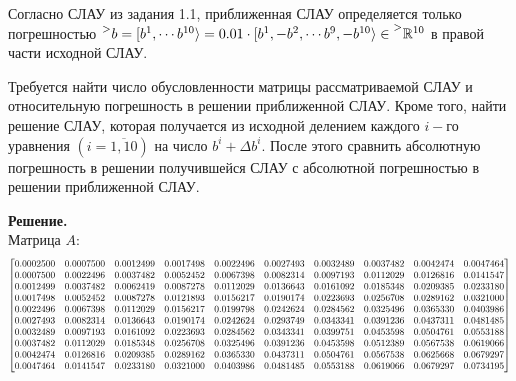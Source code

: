\documentclass[14pt,a4paper]{scrartcl}
\newcommand\scalemath[2]{\scalebox{#1}{\mbox{\ensuremath{\displaystyle #2}}}}
\begin{document}
Согласно СЛАУ из задания 1.1, приближенная СЛАУ определяется только погрешностью $\prescript{>}{}{b} = [b^1, \cdots b^{10}\rangle = 0.01 \cdot [b^1, -b^2, \cdots b^9, -b^{10}\rangle \in \prescript{>}{}{\mathbb{R}^{10}}$ в правой части исходной СЛАУ.

Требуется найти число обусловленности матрицы рассматриваемой СЛАУ и относительную погрешность в решении приближенной СЛАУ. Кроме того, найти решение СЛАУ, которая получается из исходной делением каждого $i-$го уравнения $(i = \overline{1,10})$ на число $b^i + \Delta b^i$. После этого сравнить абсолютную погрешность в решении получившейся СЛАУ с абсолютной погрешностью в решении приближенной СЛАУ.

\textbf{Решение.}\\
Матрица $A$:
\begin{equation*}
	\scalemath{0.75}
	{
		\begin{bmatrix}{}
		0.0002500 & 0.0007500 & 0.0012499 & 0.0017498 & 0.0022496 & 0.0027493 & 0.0032489 & 0.0037482 & 0.0042474 & 0.0047464 \\ 
		0.0007500 & 0.0022496 & 0.0037482 & 0.0052452 & 0.0067398 & 0.0082314 & 0.0097193 & 0.0112029 & 0.0126816 & 0.0141547 \\ 
		0.0012499 & 0.0037482 & 0.0062419 & 0.0087278 & 0.0112029 & 0.0136643 & 0.0161092 & 0.0185348 & 0.0209385 & 0.0233180 \\ 
		0.0017498 & 0.0052452 & 0.0087278 & 0.0121893 & 0.0156217 & 0.0190174 & 0.0223693 & 0.0256708 & 0.0289162 & 0.0321000 \\ 
		0.0022496 & 0.0067398 & 0.0112029 & 0.0156217 & 0.0199798 & 0.0242624 & 0.0284562 & 0.0325496 & 0.0365330 & 0.0403986 \\ 
		0.0027493 & 0.0082314 & 0.0136643 & 0.0190174 & 0.0242624 & 0.0293749 & 0.0343341 & 0.0391236 & 0.0437311 & 0.0481485 \\ 
		0.0032489 & 0.0097193 & 0.0161092 & 0.0223693 & 0.0284562 & 0.0343341 & 0.0399751 & 0.0453598 & 0.0504761 & 0.0553188 \\ 
		0.0037482 & 0.0112029 & 0.0185348 & 0.0256708 & 0.0325496 & 0.0391236 & 0.0453598 & 0.0512389 & 0.0567538 & 0.0619066 \\ 
		0.0042474 & 0.0126816 & 0.0209385 & 0.0289162 & 0.0365330 & 0.0437311 & 0.0504761 & 0.0567538 & 0.0625668 & 0.0679297 \\ 
		0.0047464 & 0.0141547 & 0.0233180 & 0.0321000 & 0.0403986 & 0.0481485 & 0.0553188 & 0.0619066 & 0.0679297 & 0.0734195 \\ 
		\end{bmatrix}
	}
\end{equation*}
\end{document}
